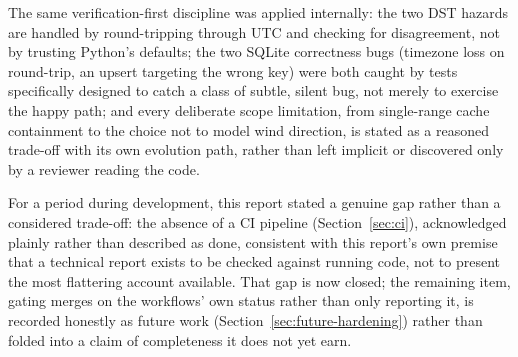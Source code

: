 \documentclass[11pt,a4paper]{article}
\begin{document}
The same verification-first discipline was applied internally: the two
DST hazards are handled by round-tripping through UTC and checking for
disagreement, not by trusting Python's defaults; the two SQLite
correctness bugs (timezone loss on round-trip, an upsert targeting the
wrong key) were both caught by tests specifically designed to catch a
class of subtle, silent bug, not merely to exercise the happy path; and
every deliberate scope limitation, from single-range cache containment to
the choice not to model wind direction, is stated as a reasoned trade-off
with its own evolution path, rather than left implicit or discovered only
by a reviewer reading the code.

For a period during development, this report stated a genuine gap rather
than a considered trade-off: the absence of a CI pipeline
(Section~\ref{sec:ci}), acknowledged plainly rather than described as
done, consistent with this report's own premise that a technical report
exists to be checked against running code, not to present the most
flattering account available. That gap is now closed; the remaining item,
gating merges on the workflows' own status rather than only reporting it,
is recorded honestly as future work (Section~\ref{sec:future-hardening})
rather than folded into a claim of completeness it does not yet earn.
\end{document}
